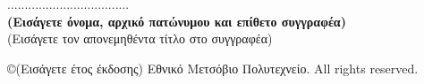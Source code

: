 \documentclass[12pt, twoside, a4paper]{report}
\begin{document}
\noindent
................................... \\
\textbf{(Εισάγετε όνομα, αρχικό πατώνυμου και επίθετο συγγραφέα)} \\
(Εισάγετε τον απονεμηθέντα τίτλο στο συγγραφέα) \\
\vspace{26ex}

\newpage
\tableofcontents
\listoffigures
\listoftables

% 
% 
% 





\newpage
\small
\noindent
{}  %
\copyright \hspace{1em}(Εισάγετε έτος έκδοσης) Εθνικό Μετσόβιο Πολυτεχνείο.
\textlatin{All rights reserved.}

\newpage
{}  %
\printindex  %
\nocite{*}
\end{document}
